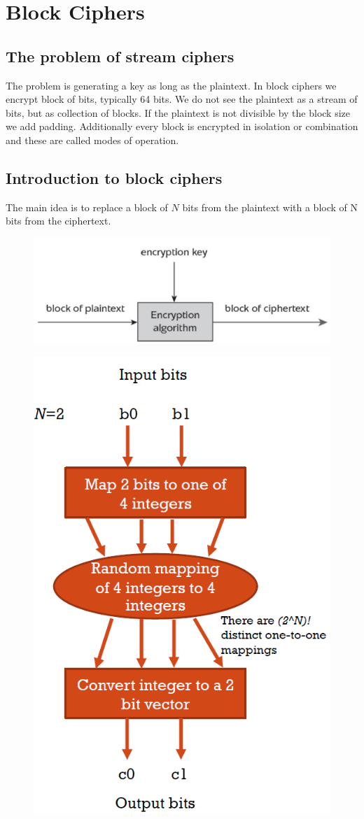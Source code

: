 \chapter{Block Ciphers}

\section{The problem of stream ciphers}

The problem is generating a key as long as the plaintext. In block ciphers we encrypt block of bits, typically 64 bits. We do not see the plaintext as a stream of bits, but as collection of blocks. If the plaintext is not divisible by the block size we add padding. Additionally every block is encrypted in isolation or combination and these are called modes of operation.

\section{Introduction to block ciphers}

The main idea is to replace a block of $N$ bits from the plaintext with a block of N bits from the ciphertext. 
\begin{figure}
	\centering
	\includegraphics[width=0.4\linewidth]{Images/Chapter3/block_cipher}
	\caption{}
	\label{fig:block_cipher}
\end{figure}

\begin{figure}
	\centering
	\includegraphics[width=0.3\linewidth]{Images/Chapter3/function_mapping}
	\caption{}
	\label{fig:function_mapping}
\end{figure}

